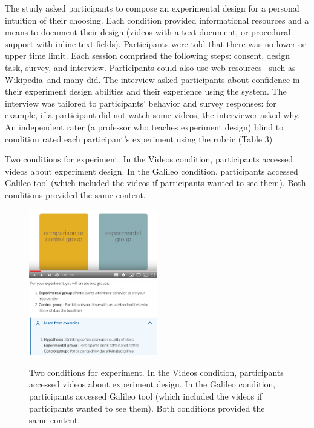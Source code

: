 The study asked participants to compose an experimental design for a personal intuition of their choosing. Each condition provided informational resources and a means to document their design (videos with a text document, or procedural support with inline text fields). Participants were told that there was no lower or upper time limit. Each session comprised the following steps: consent, design task, survey, and interview. Participants could also use web resources-- such as Wikipedia--and many did. The interview asked participants about confidence in their experiment design abilities and their experience using the system. The interview was tailored to participants’ behavior and survey responses: for example, if a participant did not watch some videos, the interviewer asked why. An independent rater (a professor who teaches experiment design) blind to condition rated each participant’s experiment using the rubric (Table 3)

Two conditions for experiment. In the Videos condition, participants accessed videos about experiment design. In the Galileo condition, participants accessed Galileo tool (which included the videos if participants wanted to see them). Both conditions provided the same content.

\begin{figure}[h] 
  \includegraphics[width=0.5\textwidth]{figures/galileo/galileo-study-1}
  \includegraphics[width=0.5\textwidth]{figures/galileo/galileo-study-2}
  \caption[]
{Two conditions for experiment. In the Videos condition, participants accessed videos about experiment design. In the Galileo condition, participants accessed Galileo tool (which included the videos if participants wanted to see them). Both conditions provided the same content. }
  \label{fig:galileo-study}
\end{figure}

